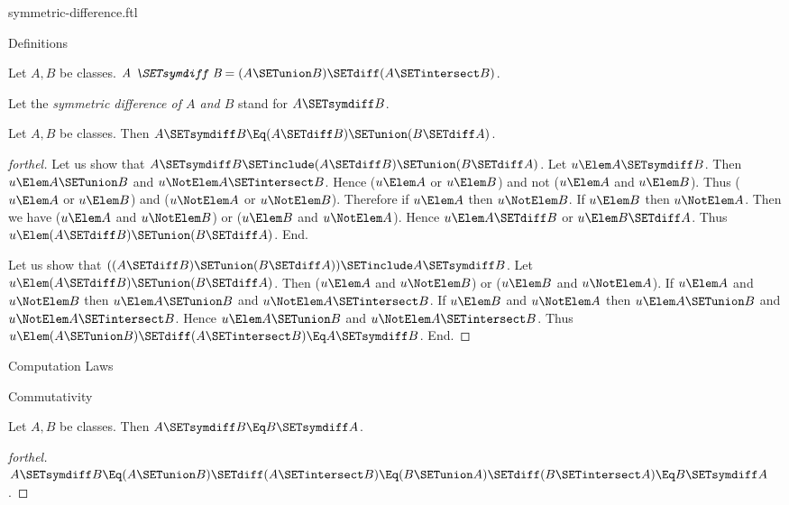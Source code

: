 \documentclass{stex}
\begin{document}
\begin{smodule}{symmetric-difference.ftl}

\begin{sfragment}{Definitions}
  \begin{definition}[forthel,id=FOUNDATIONS_03_7457594151010304]
    Let $A, B$ be classes.
    $\emph{A \SETsymdiff B} = (A \SETunion B) \SETdiff (A \SETintersect B)$.

    Let the \emph{symmetric difference of $A$ and $B$} stand for $A \SETsymdiff B$.
  \end{definition}

  \begin{proposition}[forthel,id=FOUNDATIONS_03_4886447211413504]
    Let $A, B$ be classes.
    Then $A \SETsymdiff B \Eq (A \SETdiff B) \SETunion (B \SETdiff A)$.
  \end{proposition}
  \begin{proof}[forthel]
    Let us show that $A \SETsymdiff B \SETinclude (A \SETdiff B) \SETunion (B \SETdiff A)$.
      Let $u \Elem A \SETsymdiff B$.
      Then $u \Elem A \SETunion B$ and $u \NotElem A \SETintersect B$.
      Hence ($u \Elem A$ or $u \Elem B$) and not ($u \Elem A$ and $u \Elem B$).
      Thus ($u \Elem A$ or $u \Elem B$) and ($u \NotElem A$ or $u \NotElem B$).
      Therefore if $u \Elem A$ then $u \NotElem B$.
      If $u \Elem B$ then $u \NotElem A$.
      Then we have ($u \Elem A$ and $u \NotElem B$) or ($u \Elem B$ and $u \NotElem A$).
      Hence $u \Elem A \SETdiff B$ or $u \Elem B \SETdiff A$.
      Thus $u \Elem (A \SETdiff B) \SETunion (B \SETdiff A)$.
    End.

    Let us show that $((A \SETdiff B) \SETunion (B \SETdiff A)) \SETinclude A \SETsymdiff B$. %
      Let $u \Elem (A \SETdiff B) \SETunion (B \SETdiff A)$.
      Then ($u \Elem A$ and $u \NotElem B$) or ($u \Elem B$ and $u \NotElem A$).
      If $u \Elem A$ and $u \NotElem B$ then $u \Elem A \SETunion B$ and $u \NotElem A \SETintersect B$.
      If $u \Elem B$ and $u \NotElem A$ then $u \Elem A \SETunion B$ and $u \NotElem A \SETintersect B$.
      Hence $u \Elem A \SETunion B$ and $u \NotElem A \SETintersect B$.
      Thus $u \Elem (A \SETunion B) \SETdiff (A \SETintersect B) \Eq A \SETsymdiff B$.
    End.
  \end{proof}
\end{sfragment}

\begin{sfragment}{Computation Laws}
  \begin{sfragment}{Commutativity}
    \begin{proposition}[forthel,id=FOUNDATIONS_03_4518372049944576]
      Let $A, B$ be classes.
      Then $A \SETsymdiff B \Eq B \SETsymdiff A$.
    \end{proposition}
    \begin{proof}[forthel]
      $A \SETsymdiff B
        \Eq (A \SETunion B) \SETdiff (A \SETintersect B)
        \Eq (B \SETunion A) \SETdiff (B \SETintersect A)
        \Eq B \SETsymdiff A$.
    \end{proof}
  \end{sfragment}


\end{sfragment}
\end{smodule}
\end{document}
